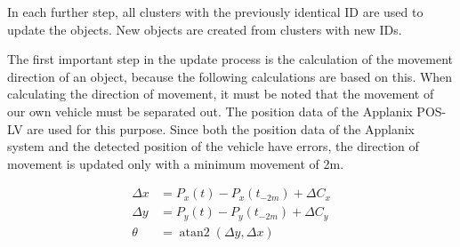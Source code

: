 \documentclass[11pt,oneside,openright]{mpreport}
\DeclareMathOperator{\atantwo}{atan2}
\begin{document}



In each further step, all clusters with the previously identical ID are used to update the objects. New objects are created from clusters with new IDs.

The first important step in the update process is the calculation of the movement direction of an object, because the following calculations are based on this.
When calculating the direction of movement, it must be noted that the movement of our own vehicle must be separated out. The position data of the Applanix POS-LV are used for this purpose.
Since both the position data of the Applanix system and the detected position of the vehicle have errors, the direction of movement is updated only with a minimum movement of 2m.

\begin{align*}
\Delta x &= P_x(t) - P_x(t_{-2m}) + \Delta C_x\\
\Delta y &= P_y(t) - P_y(t_{-2m}) + \Delta C_y\\
\theta &= \atantwo(\Delta y,\Delta x)
\end{align*}
\end{document}
